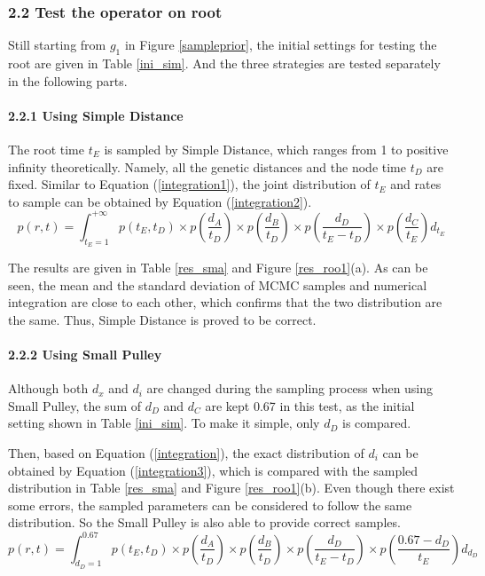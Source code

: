 \documentclass{bmcart}
\begin{document}
\begin{backmatter}
\subsubsection*{2.2 Test the operator on root}

Still starting from $g_1$ in Figure \ref{sampleprior}, the initial settings for testing the root are given in Table \ref{ini_sim}. And the three strategies are tested separately in the following parts.

\paragraph*{2.2.1 Using Simple Distance}

The root time $t_E$ is sampled by Simple Distance, which ranges from 1 to positive infinity theoretically. Namely, all the genetic distances and the node time $t_D$  are fixed. Similar to Equation (\ref{integration1}), the joint distribution of $t_E$ and rates to sample can be obtained by Equation (\ref{integration2}).
\begin{equation}
\label{integration2}
p(r,t) = \int_{{t_E} = 1}^{ + \infty } {p({t_E},{t_D}) \times p(\frac{{{d_A}}}{{{t_D}}}) \times p(\frac{{{d_B}}}{{{t_D}}}) \times p(\frac{{{d_D}}}{{{t_E} - {t_D}}}) \times p(\frac{{{d_C}}}{{{t_E}}}){d_{t_E}}}
\end{equation}

The results are given in Table \ref{res_sma} and Figure \ref{res_roo1}(a). As can be seen, the mean and the standard deviation of MCMC samples and numerical integration are close to each other, which confirms that the two distribution are the same. Thus, Simple Distance is proved to be correct.

\paragraph*{2.2.2 Using Small Pulley}

Although both ${d_x}$ and ${d_i}$ are changed during the sampling process when using Small Pulley, the sum of ${d_D}$ and ${d_C}$ are kept 0.67 in this test, as the initial setting shown in Table \ref{ini_sim}. To make it simple, only ${d_D}$ is compared.

Then, based on Equation (\ref{integration}), the exact distribution of ${d_i}$ can be obtained by Equation (\ref{integration3}), which is compared with the sampled distribution in Table \ref{res_sma} and Figure \ref{res_roo1}(b). Even though there exist some errors, the sampled parameters can be considered to follow the same distribution. So the Small Pulley is also able to provide correct samples.
\begin{equation}\label{integration3}
p(r,t) = \int_{{d_D} = 1}^{0.67} {p({t_E},{t_D}) \times p(\frac{{{d_A}}}{{{t_D}}}) \times p(\frac{{{d_B}}}{{{t_D}}}) \times p(\frac{{{d_D}}}{{{t_E} - {t_D}}}) \times p(\frac{{0.67 - {d_D}}}{{{t_E}}}){d_{d_D}}}
\end{equation}


\end{backmatter}
\end{document}
